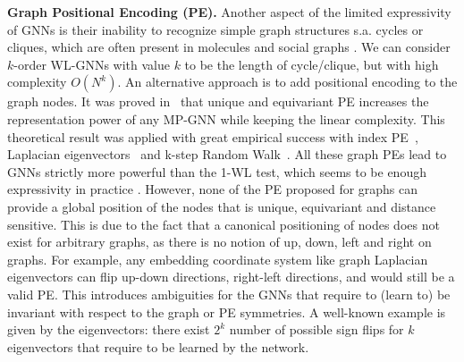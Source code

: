 \documentclass{article}
\begin{document}
{\bf Graph Positional Encoding (PE).} Another aspect of the limited expressivity of GNNs is their inability to recognize simple graph structures s.a. cycles or cliques, which are often present in molecules and social graphs \citep{chen2020can}. We can consider $k$-order WL-GNNs with value $k$ to be the length of cycle/clique, but with high complexity $O(N^k)$. An alternative approach is to add positional encoding to the graph nodes. It was proved in~\citet{murphy2019relational,Loukas2020What} that unique and equivariant PE increases the representation power of any MP-GNN while keeping the linear complexity. 
This theoretical result was applied with great empirical success with index PE~\citep{murphy2019relational},  Laplacian eigenvectors~\citep{dwivedi2020benchmarking,dwivedi2021generalization,kreuzer2021rethinking,lim2022sign} and k-step Random Walk~\citep{li2020distance,dwivedi2021graph}.
All these graph PEs lead to GNNs strictly more powerful than the 1-WL test, which seems to be enough expressivity in practice \citep{zopf20221}. However, none of the PE proposed for graphs can provide a global position of the nodes that is unique, equivariant and distance sensitive. This is due to the fact that a canonical positioning of nodes does not exist for arbitrary graphs, as there is no notion of up, down, left and right on graphs. For example, any embedding coordinate system like graph Laplacian eigenvectors \citep{belkin2003laplacian} can flip up-down directions, right-left directions, and would still be a valid PE. This introduces ambiguities for the GNNs that require to (learn to) be invariant with respect to the graph or PE symmetries. A well-known example is given by the eigenvectors: there exist $2^k$ number of possible sign flips for $k$ eigenvectors that require to be learned by the network. 
\end{document}
